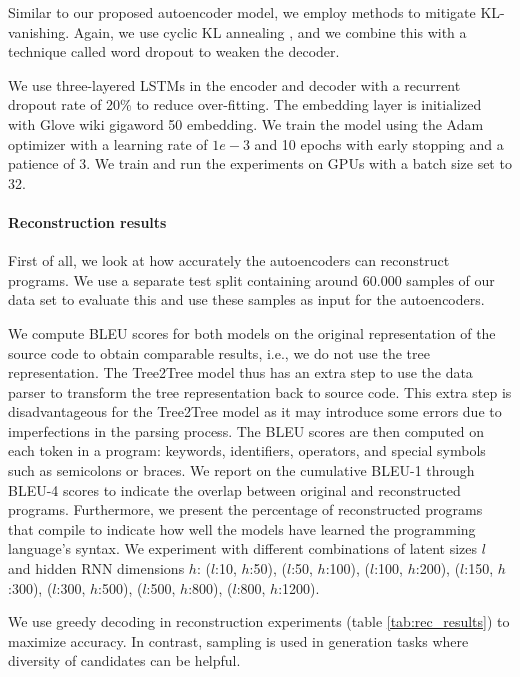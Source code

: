 Similar to our proposed autoencoder model, we employ methods to mitigate KL-vanishing. Again, we use cyclic KL annealing \cite{fu2019cyclical}, and we combine this with a technique called word dropout \cite{bowman2015generating} to weaken the decoder.

We use three-layered LSTMs in the encoder and decoder with a recurrent dropout rate of 20\% to reduce over-fitting. The embedding layer is initialized with Glove wiki gigaword 50 \cite{pennington2014glove} embedding. We train the model using the Adam optimizer \cite{kingma2014adam} with a learning rate of $1e-3$ and 10 epochs with early stopping and a patience of 3. We train and run the experiments on GPUs with a batch size set to 32.

\paragraph{Reconstruction results}\label{sec:recon-results}
First of all, we look at how accurately the autoencoders can reconstruct programs. We use a separate test split containing around 60.000 samples of our data set to evaluate this and use these samples as input for the autoencoders. 



We compute BLEU scores \cite{papineni2002bleu} for both models on the original representation of the source code to obtain comparable results, i.e., we do not use the tree representation. The Tree2Tree model thus has an extra step to use the data parser to transform the tree representation back to source code. This extra step is disadvantageous for the Tree2Tree model as it may introduce some errors due to imperfections in the parsing process. The BLEU scores are then computed on each token in a program: keywords, identifiers, operators, and special symbols such as semicolons or braces. We report on the cumulative BLEU-1 through BLEU-4 scores to indicate the overlap between original and reconstructed programs. Furthermore, we present the percentage of reconstructed programs that compile to indicate how well the models have learned the programming language's syntax. We experiment with different combinations of latent sizes $l$ and hidden RNN dimensions $h$:  ($l$:10,  $h$:50), ($l$:50, $h$:100), ($l$:100, $h$:200), ($l$:150, $h$:300), ($l$:300, $h$:500), ($l$:500, $h$:800), ($l$:800, $h$:1200).



We use greedy decoding in reconstruction experiments (table \ref{tab:rec_results}) to maximize accuracy. In contrast, sampling is used in generation tasks where diversity of candidates can be helpful.

